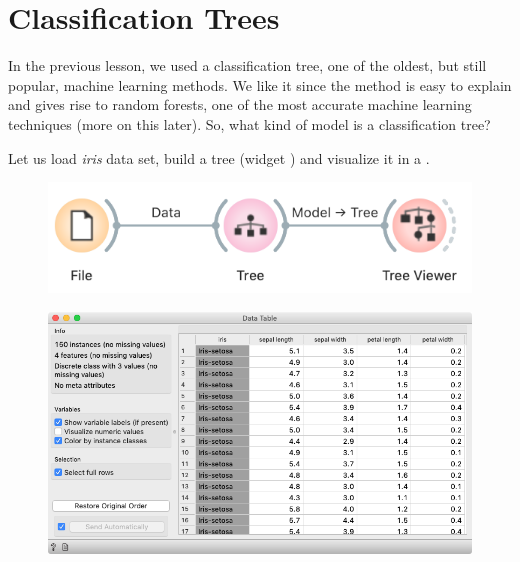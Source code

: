 \chapter{Classification Trees}
\label{ch:classification-trees}

In the previous lesson, we used a classification tree,
one of the oldest, but still popular, machine learning methods. We like it since the method is easy to explain and gives rise to random forests, one of the most accurate machine learning techniques (more on this later). So, what kind of model is a classification tree?

Let us load \textit{iris} data set, build a tree (widget ) and visualize it in a .

\begin{figure}[h]
    \centering
    \includegraphics[scale=0.4]{graphics/ch-classification_trees/workflow-tree-viewer.png}
\end{figure}

\begin{figure}[h]
    \vspace{-0.4cm}
    \includegraphics[scale=0.35]{graphics/ch-classification_trees/iris-data.png}
    \label{fig:classification-predictions}
\end{figure}

